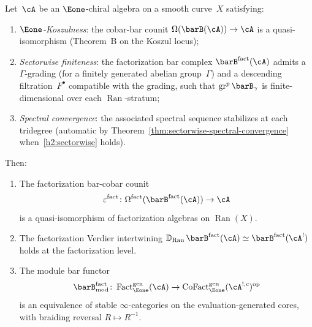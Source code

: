 \begin{theorem}
\label{thm:h-level-factorization-kd}
Let~$\cA$ be an $\Eone$-chiral algebra on a smooth curve~$X$
satisfying:
\begin{enumerate}[label=\textup{(H\arabic*)}]
\item\label{h1:koszulness} \emph{$\Eone$-Koszulness}: the cobar-bar
  counit
  $\Omega(\barB(\cA)) \to \cA$ is a quasi-isomorphism
  \textup{(}Theorem~B on the Koszul locus\textup{)};
\item\label{h2:sectorwise} \emph{Sectorwise finiteness}: the
  factorization bar complex $\barB^{\mathrm{fact}}(\cA)$ admits a
  $\Gamma$-grading \textup{(}for a finitely generated abelian
  group~$\Gamma$\textup{)} and a descending
  filtration~$F^\bullet$ compatible with the grading, such that
  $\operatorname{gr}^p \barB_\gamma$ is finite-dimensional
  over each $\operatorname{Ran}$-stratum;
\item\label{h3:convergence} \emph{Spectral convergence}: the
  associated spectral sequence stabilizes at each tridegree
  \textup{(}automatic by
  Theorem~\textup{\ref{thm:sectorwise-spectral-convergence}}
  when~\ref{h2:sectorwise} holds\textup{)}.
\end{enumerate}
Then:
\begin{enumerate}[label=\textup{(\roman*)}]
\item The factorization bar-cobar counit
  \[
  \varepsilon^{\mathrm{fact}}\colon
  \Omega^{\mathrm{fact}}(\barB^{\mathrm{fact}}(\cA)) \to \cA
  \]
  is a quasi-isomorphism of factorization algebras on
  $\operatorname{Ran}(X)$.
\item The factorization Verdier intertwining
  $\mathbb{D}_{\mathrm{Ran}}\,
  \barB^{\mathrm{fact}}(\cA)
  \simeq \barB^{\mathrm{fact}}(\cA^!)$
  holds at the factorization level.
\item The module bar functor
  \[
  \barB_{\mathrm{mod}}^{\mathrm{fact}}\colon
  \operatorname{Fact}_{\Eone}^{\mathrm{gen}}(\cA)
  \to
  \operatorname{CoFact}_{\Eone}^{\mathrm{gen}}
    (\cA^{!,c})^{\mathrm{op}}
  \]
  is an equivalence of stable $\infty$-categories on the
  evaluation-generated cores, with braiding reversal
  $R \mapsto R^{-1}$.
\end{enumerate}
\end{theorem}

